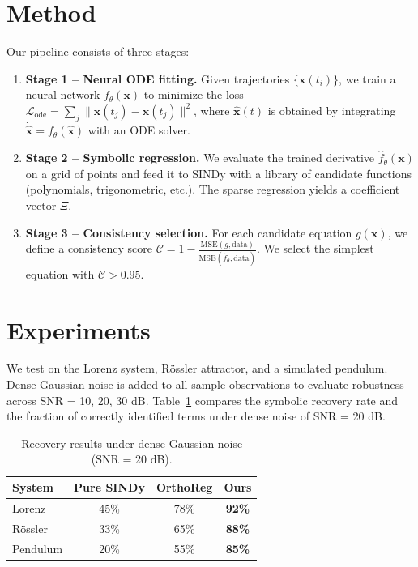 \documentclass{article}
\begin{document}
\section{Method}
\label{sec:method}
Our pipeline consists of three stages:
\begin{enumerate}
    \item \textbf{Stage 1 – Neural ODE fitting.} Given trajectories $\{\mathbf{x}(t_i)\}$, we train a neural network $f_\theta(\mathbf{x})$ to minimize the loss $\mathcal{L}_{\text{ode}} = \sum_j\|\hat{\mathbf{x}}(t_j) - \mathbf{x}(t_j)\|^2$, where $\hat{\mathbf{x}}(t)$ is obtained by integrating $\dot{\hat{\mathbf{x}}} = f_\theta(\hat{\mathbf{x}})$ with an ODE solver.
    \item \textbf{Stage 2 – Symbolic regression.} We evaluate the trained derivative $\hat{f}_\theta(\mathbf{x})$ on a grid of points and feed it to SINDy with a library of candidate functions (polynomials, trigonometric, etc.). The sparse regression yields a coefficient vector $\Xi$.
    \item \textbf{Stage 3 – Consistency selection.} For each candidate equation $g(\mathbf{x})$, we define a consistency score $\mathcal{C} = 1 - \frac{\text{MSE}(g, \text{data})}{\text{MSE}(\hat{f}_\theta, \text{data})}$. We select the simplest equation with $\mathcal{C} > 0.95$.
\end{enumerate}

\section{Experiments}
We test on the Lorenz system, Rössler attractor, and a simulated pendulum. Dense Gaussian noise is added to all sample observations to evaluate robustness across SNR = 10, 20, 30 dB. Table~\ref{tab:results} compares the symbolic recovery rate and the fraction of correctly identified terms under dense noise of SNR = 20 dB.

\begin{table}[htbp]
\centering
\caption{Recovery results under dense Gaussian noise (SNR = 20 dB).}
\label{tab:results}
\begin{tabular}{lccc}
\toprule
System & Pure SINDy & OrthoReg & Ours \\
\midrule
Lorenz   & 45\% & 78\% & \textbf{92\%} \\
Rössler  & 33\% & 65\% & \textbf{88\%} \\
Pendulum & 20\% & 55\% & \textbf{85\%} \\
\bottomrule
\end{tabular}
\end{table}
\end{document}

